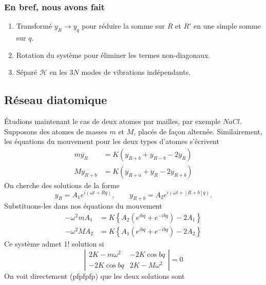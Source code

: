 	\subsubsection{En bref, nous avons fait}
	\begin{enumerate}
	\item Transformé $y_R \rightarrow y_q$ pour réduire la somme sur $R$ et $R'$
	en une simple somme sur $q$.
	\item Rotation du système pour éliminer les termes non-diagonaux.
	\item Séparé $\mathcal{H}$ en les $3N$ modes de vibrations indépendants.
	\end{enumerate}
	
	
	\subsection{Réseau diatomique}
	Étudions maintenant le cas de deux atomes par mailles, par exemple $NaCl$. 
	Supposons des atomes de masses $m$ et $M$, placés de façon alternée. 
	Similairement, les équations du mouvement pour les deux types d'atomes 
	s'écrivent
	\begin{equation}
	\begin{array}{ll}
	m\ddot{y_R} &= K(y_{R+b}+y_{R-b}-2y_R)\\
	M\ddot{y_{R+b}} &= K(y_{R+a}+y_R-2y_{R+b})
	\end{array}
	\end{equation}
	On cherche des solutions de la forme
	\begin{equation}
	y_R = A_1e^{i(\omega t + Rq)}, \qquad y_{R+b} = A_2e^{i(\omega t + [R+b]q)}.
	\end{equation}
	Substituons-les dans nos équations du mouvement
	\begin{equation}
	\begin{array}{ll}
	-\omega^2 mA_1 &= K\left\{A_2(e^{ibq}+e^{-ibq})-2A_1\right\}\\
	-\omega^2 MA_2 &= K\left\{A_1(e^{ibq}+e^{-ibq})-2A_2\right\}	
	\end{array}
	\end{equation}
	Ce système admet 1! solution si
	\begin{equation}
	\left|\begin{array}{cc}
	2K-m\omega^2 & -2K\cos bq\\
	-2K\cos bq & 2K-M\omega^2
	\end{array}\right| = 0
	\end{equation}
	On voit directement (pfpfpfp) que les deux solutions sont
